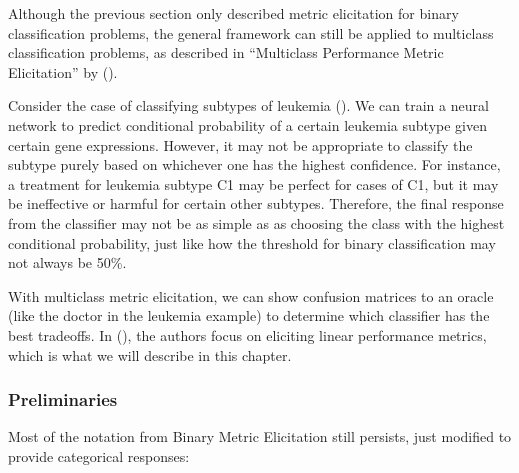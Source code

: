 \documentclass[
  letterpaper,
  numbers=noenddot,
  DIV=11]{scrreprt}
\theoremstyle{plain}
\theoremstyle{definition}
\theoremstyle{plain}
\theoremstyle{remark}
\begin{document}
Although the previous section only described metric elicitation for
binary classification problems, the general framework can still be
applied to multiclass classification problems, as described in
``Multiclass Performance Metric Elicitation'' by
().

Consider the case of classifying subtypes of leukemia
(). We can
train a neural network to predict conditional probability of a certain
leukemia subtype given certain gene expressions. However, it may not be
appropriate to classify the subtype purely based on whichever one has
the highest confidence. For instance, a treatment for leukemia subtype
C1 may be perfect for cases of C1, but it may be ineffective or harmful
for certain other subtypes. Therefore, the final response from the
classifier may not be as simple as as choosing the class with the
highest conditional probability, just like how the threshold for binary
classification may not always be 50\%.

With multiclass metric elicitation, we can show confusion matrices to an
oracle (like the doctor in the leukemia example) to determine which
classifier has the best tradeoffs. In
(), the
authors focus on eliciting linear performance metrics, which is what we
will describe in this chapter.

\subsubsection*{Preliminaries}\label{preliminaries}

Most of the notation from Binary Metric Elicitation still persists, just
modified to provide categorical responses:
\end{document}
